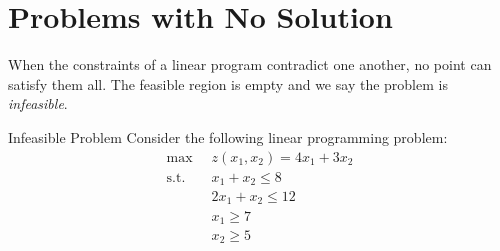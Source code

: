\section{Problems with No Solution}\label{sec:no-solution}

When the constraints of a linear program contradict one another, no point can satisfy them all. The feasible region is empty and we say the problem is \emph{infeasible}.

\begin{example}{Infeasible Problem}\label{exa:LPInfeasible}
 Consider the following linear programming problem:
\begin{equation}
\begin{aligned}
\max\;\;& z(x_1,x_2) = 4x_1 + 3x_2\\
\text{s.t.}\;\;& x_1 + x_2 \leq 8\\
& 2x_1 + x_2 \leq 12\\
& x_1 \geq 7\\
& x_2 \geq 5
\end{aligned}
\label{eqn:LPInfeasible}
\end{equation}
\end{example}
